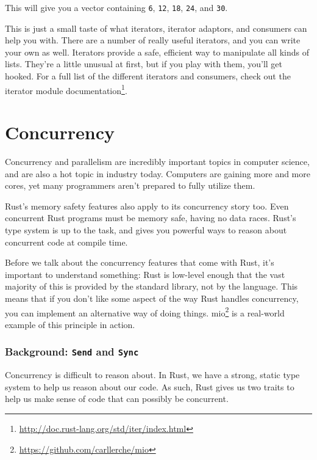 \documentclass[a4paper,]{book}
\renewcommand{\href}[2]{#2\footnote{\url{#1}}}
\begin{document}
This will give you a vector containing \texttt{6}, \texttt{12},
\texttt{18}, \texttt{24}, and \texttt{30}.

This is just a small taste of what iterators, iterator adaptors, and
consumers can help you with. There are a number of really useful
iterators, and you can write your own as well. Iterators provide a safe,
efficient way to manipulate all kinds of lists. They're a little unusual
at first, but if you play with them, you'll get hooked. For a full list
of the different iterators and consumers, check out the
\href{http://doc.rust-lang.org/std/iter/index.html}{iterator module
documentation}.

\hypertarget{sec--concurrency}{\section{Concurrency}\label{sec--concurrency}}

Concurrency and parallelism are incredibly important topics in computer
science, and are also a hot topic in industry today. Computers are
gaining more and more cores, yet many programmers aren't prepared to
fully utilize them.

Rust's memory safety features also apply to its concurrency story too.
Even concurrent Rust programs must be memory safe, having no data races.
Rust's type system is up to the task, and gives you powerful ways to
reason about concurrent code at compile time.

Before we talk about the concurrency features that come with Rust, it's
important to understand something: Rust is low-level enough that the
vast majority of this is provided by the standard library, not by the
language. This means that if you don't like some aspect of the way Rust
handles concurrency, you can implement an alternative way of doing
things. \href{https://github.com/carllerche/mio}{mio} is a real-world
example of this principle in action.

\subsubsection{\texorpdfstring{Background: \texttt{Send} and
\texttt{Sync}}{Background: Send and Sync}}\label{background-send-and-sync}

Concurrency is difficult to reason about. In Rust, we have a strong,
static type system to help us reason about our code. As such, Rust gives
us two traits to help us make sense of code that can possibly be
concurrent.
\end{document}
